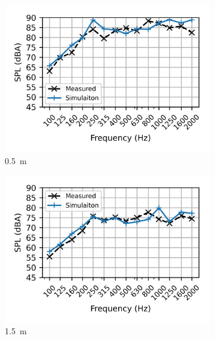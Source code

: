 \begin{figure}%
	\centering
	\begin{subfigure}[b]{0.49\textwidth}
		\centering
		\includegraphics{fig/chap5/initial_model/freq_spectrum/pos_10cm_0pt5m.png}
		\caption{\SI{0.5}{\meter}}
	\end{subfigure}
	\hfill
	\begin{subfigure}[b]{0.49\textwidth}
		\centering
		\includegraphics{fig/chap5/initial_model/freq_spectrum/pos_10cm_1pt5m.png}
		\caption{\SI{1.5}{\meter}}
	\end{subfigure}
	\begin{subfigure}[b]{0.49\textwidth}

\end{subfigure}
\end{figure}
